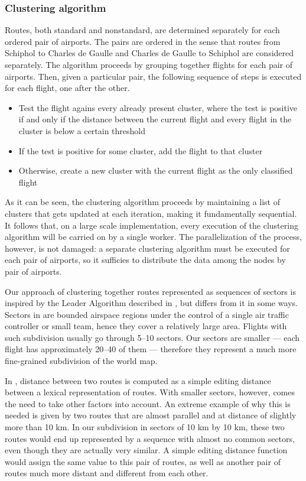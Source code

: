 \documentclass{vldb}
\begin{document}
\subsubsection{Clustering algorithm}

Routes, both standard and nonstandard, are determined separately for each
ordered pair of airports. The pairs are ordered in the sense that routes from
Schiphol to Charles de Gaulle and Charles de Gaulle to Schiphol are considered
separately. The algorithm proceeds by grouping together flights for each pair of
airports. Then, given a particular pair, the following sequence of steps is
executed for each flight, one after the other.

\begin{itemize}
  \item Test the flight agains every already present cluster, where the test is
  positive if and only if the distance between the current flight and every
  flight in the cluster is below a certain threshold
  \item If the test is positive for some cluster, add the flight to that cluster
  \item Otherwise, create a new cluster with the current flight as the only
  classified flight
\end{itemize}

As it can be seen, the clustering algorithm proceeds by maintaining a list of
clusters that gets updated at each iteration, making it fundamentally
sequential. It follows that, on a large scale implementation, every execution of
the clustering algorithm will be carried on by a single worker. The
parallelization of the process, however, is not damaged: a separate clustering
algorithm must be executed for each pair of airports, so it sufficies to
distribute the data among the nodes by pair of airports.

Our approach of clustering together routes represented as sequences of sectors
is inspired by the Leader Algorithm described in \cite{routeclustering}, but
differs from it in some ways. Sectors in \cite{routeclustering} are bounded
airspace regions under the control of a single air traffic controller or small
team, hence they cover a relatively large area. Flights with such subdivision
usually go through 5--10 sectors. Our sectors are smaller --- each flight has
approximately 20--40 of them --- therefore they represent a much more
fine-grained subdivision of the world map.

In \cite{routeclustering}, distance between two routes is computed as a simple
editing distance between a lexical representation of routes. With smaller
sectors, however, comes the need to take other factors into account. An extreme
example of why this is needed is given by two routes that are almost parallel
and at distance of slightly more than 10 km. In our subdivision in sectors of 10
km by 10 km, these two routes would end up represented by a sequence with almost
no common sectors, even though they are actually very similar. A simple editing
distance function would assign the same value to this pair of routes, as well as
another pair of routes much more distant and different from each other.
\end{document}

